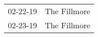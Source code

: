 \begin{supertabular}{p{0.25\columnwidth}p{0.75\columnwidth}}
 02-22-19 &  The Fillmore \\
 02-23-19 &  The Fillmore \\
\end{supertabular}
